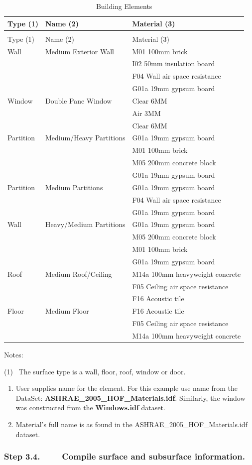 \begin{longtable}[c]{@{}lll@{}}
\caption{Building Elements \label{table:building-elements}} \tabularnewline
\toprule 
Type (1) & Name (2) & Material (3) \tabularnewline
\midrule
\endfirsthead

\caption[]{Building Elements} \tabularnewline
\toprule 
Type (1) & Name (2) & Material (3) \tabularnewline
\midrule
\endhead

Wall & Medium Exterior Wall & M01 100mm brick \tabularnewline
~ & ~ & I02 50mm insulation board \tabularnewline
~ & ~ & F04 Wall air space resistance \tabularnewline
~ & ~ & G01a 19mm gypsum board \tabularnewline
Window & Double Pane Window & Clear 6MM \tabularnewline
~ & ~ & Air 3MM \tabularnewline
~ & ~ & Clear 6MM \tabularnewline
Partition & Medium/Heavy Partitions & G01a 19mm gypsum board \tabularnewline
~ & ~ & M01 100mm brick \tabularnewline
~ & ~ & M05 200mm concrete block \tabularnewline
~ & ~ & G01a 19mm gypsum board \tabularnewline
Partition & Medium Partitions & G01a 19mm gypsum board \tabularnewline
~ & ~ & F04 Wall air space resistance \tabularnewline
~ & ~ & G01a 19mm gypsum board \tabularnewline
Wall & Heavy/Medium Partitions & G01a 19mm gypsum board \tabularnewline
~ & ~ & M05 200mm concrete block \tabularnewline
~ & ~ & M01 100mm brick \tabularnewline
~ & ~ & G01a 19mm gypsum board \tabularnewline
Roof & Medium Roof/Ceiling & M14a 100mm heavyweight concrete \tabularnewline
~ & ~ & F05 Ceiling air space resistance \tabularnewline
~ & ~ & F16 Acoustic tile \tabularnewline
Floor & Medium Floor & F16 Acoustic tile \tabularnewline
~ & ~ & F05 Ceiling air space resistance \tabularnewline
~ & ~ & M14a 100mm heavyweight concrete \tabularnewline
\bottomrule
\end{longtable}

Notes:

(1)~ The surface type is a wall, floor, roof, window or door.

\begin{enumerate}
\def\labelenumi{(\arabic{enumi})}
\setcounter{enumi}{1}
\item
  User supplies name for the element. For this example use name from the DataSet: \textbf{ASHRAE\_2005\_HOF\_Materials.idf}. Similarly, the window was constructed from the \textbf{Windows.idf} dataset.
\item
  Material's full name is as found in the ASHRAE\_2005\_HOF\_Materials.idf dataset.
\end{enumerate}

\subsubsection{Step 3.4.~~~~ Compile surface and subsurface information.}\label{step-3.4.-compile-surface-and-subsurface-information.}

